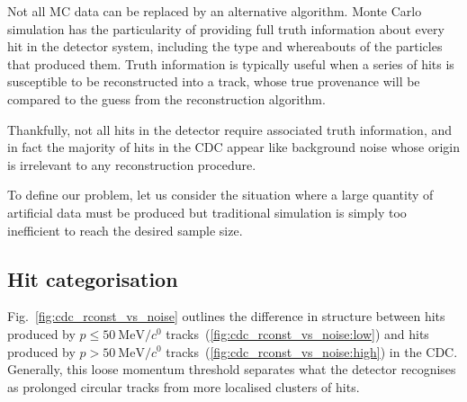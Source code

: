 Not all MC data can be replaced by an alternative algorithm. Monte Carlo simulation has the particularity of providing full truth information about every hit in the detector system, including the type and whereabouts of the particles that produced them.
Truth information is typically useful when a series of hits is susceptible to be reconstructed into a track, whose true provenance will be compared to the guess from the reconstruction algorithm. %

Thankfully, not all hits in the detector require associated truth information, and in fact the majority of hits in the CDC appear like background noise whose origin is irrelevant to any reconstruction procedure. %

To define our problem, let us consider the situation where a large quantity of artificial data must be produced but traditional simulation is simply too inefficient to reach the desired sample size.


\subsection{Hit categorisation}
Fig.~\ref{fig:cdc_rconst_vs_noise} outlines the difference in structure between hits produced by $p\leq\SI{50}{\MeV/\clight}$ tracks~(\ref{fig:cdc_rconst_vs_noise:low}) and hits produced by $p>\SI{50}{\MeV/\clight}$ tracks~(\ref{fig:cdc_rconst_vs_noise:high}) in the CDC. Generally, this loose momentum threshold separates what the detector recognises as prolonged circular tracks from more localised clusters of hits.


